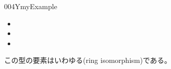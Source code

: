 \documentclass[index]{subfiles}
\begin{document}
\begin{myBlock}{004Y}{myExample}
\begin{itemize}
{    {f
     \myIdType {}\myRecordField\myRingPlus
     }}
  \item {}
  \item {}
  \item {}
  \end{itemize}
  この型の要素はいわゆる(ring isomorphism)である。
\end{myBlock}
\end{document}
